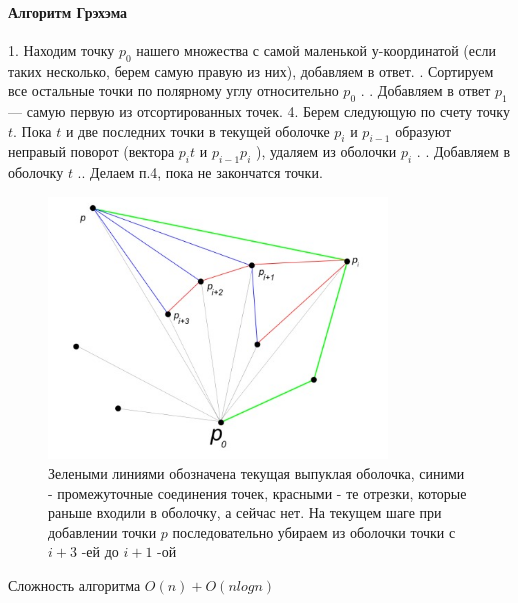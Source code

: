 \paragraph*{Алгоритм Грэхэма}
1. Находим точку $p_0$
нашего множества с самой маленькой $у$-координатой (если таких несколько, берем самую правую из них), добавляем в ответ. \newline{}. Сортируем все остальные точки по полярному углу относительно $p_0$
. \newline{}. Добавляем в ответ $p_1$ --- самую первую из отсортированных точек.
4. Берем следующую по счету точку $t$. Пока $t$
и две последних точки в текущей оболочке $p_i$
и $p_{i-1}$
образуют неправый поворот (вектора $p_it$
и $p_{i-1}p_i$
), удаляем из оболочки $p_i$
. \newline{}. Добавляем в оболочку $t$
.\newline{}. Делаем п.4, пока не закончатся точки.
\begin{figure}[H]
    \centering
    \includegraphics[width = 9cm]{Graham.jpeg}
    \caption{Зелеными линиями обозначена текущая выпуклая оболочка, синими - промежуточные соединения точек, красными - те отрезки, которые раньше входили в оболочку, а сейчас нет. На текущем шаге при добавлении точки $p$
        последовательно убираем из оболочки точки с $i+3$
        -ей до $i+1$
        -ой}
    \label{fig:float}
\end{figure}
Сложность алгоритма $O(n) + O(nlogn)$

